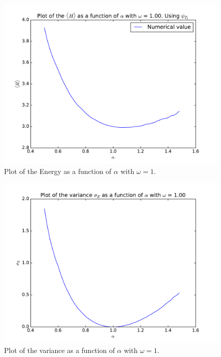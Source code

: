 \documentclass[12pt]{article}
\begin{document}
\begin{figure}[h]
\centering
\includegraphics[width=\linewidth]{Plots/Energy_alpha_plot_omega1.pdf}
\caption{Plot of the Energy as a function of $\alpha$ with $\omega = 1$.}
\label{fig:Energy_alpha_omega1}
\end{figure}
\begin{figure}[h]
\centering
\includegraphics[width=\linewidth]{Plots/Variance_alpha_plot_omega1.pdf}
\caption{Plot of the variance as a function of $\alpha$ with $\omega = 1$.}
\label{fig:Variance_alpha_omega1}
\end{figure}
\end{document}
